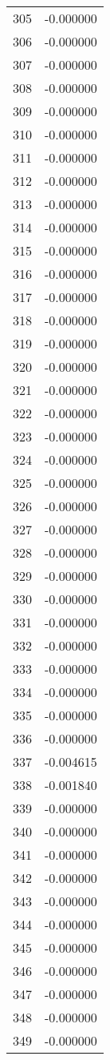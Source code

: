 \documentclass[12pt]{article}
\begin{document}
\begin{longtable}{@{}cc@{}}
305 & -0.000000 \\
306 & -0.000000 \\
307 & -0.000000 \\
308 & -0.000000 \\
309 & -0.000000 \\
310 & -0.000000 \\
311 & -0.000000 \\
312 & -0.000000 \\
313 & -0.000000 \\
314 & -0.000000 \\
315 & -0.000000 \\
316 & -0.000000 \\
317 & -0.000000 \\
318 & -0.000000 \\
319 & -0.000000 \\
320 & -0.000000 \\
321 & -0.000000 \\
322 & -0.000000 \\
323 & -0.000000 \\
324 & -0.000000 \\
325 & -0.000000 \\
326 & -0.000000 \\
327 & -0.000000 \\
328 & -0.000000 \\
329 & -0.000000 \\
330 & -0.000000 \\
331 & -0.000000 \\
332 & -0.000000 \\
333 & -0.000000 \\
334 & -0.000000 \\
335 & -0.000000 \\
336 & -0.000000 \\
337 & -0.004615 \\
338 & -0.001840 \\
339 & -0.000000 \\
340 & -0.000000 \\
341 & -0.000000 \\
342 & -0.000000 \\
343 & -0.000000 \\
344 & -0.000000 \\
345 & -0.000000 \\
346 & -0.000000 \\
347 & -0.000000 \\
348 & -0.000000 \\
349 & -0.000000 \\

\end{longtable}
\end{document}
